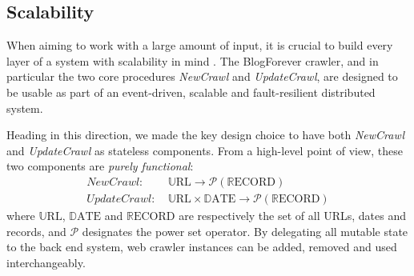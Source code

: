\subsection{Scalability}
When aiming to work with a large amount of input, it is crucial to build every layer of a system with scalability in mind \cite{thereactivemanifesto2013}. The BlogForever crawler, and in particular the two core procedures \emph{NewCrawl} and \emph{UpdateCrawl}, are designed to be usable as part of an event-driven, scalable and fault-resilient distributed system.

Heading in this direction, we made the key design choice to have both \emph{NewCrawl} and \emph{UpdateCrawl} as stateless components. From a high-level point of view, these two components are \emph{purely functional}:
%
\newcommand\URL{\mathbb{U}\text{RL}}
\newcommand\DATE{\mathbb{D}\text{ATE}}
\newcommand\RECORD{\mathbb{R}\text{ECORD}}
\begin{equation*}
  \begin{split}
    NewCrawl:    &~ \URL \rightarrow \mathcal{P}(\RECORD)\\
    UpdateCrawl: &~ \URL \times \DATE \rightarrow \mathcal{P}(\RECORD)
  \end{split}
\end{equation*}
%
where $\URL$, $\DATE$ and $\RECORD$ are respectively the set of all URLs, dates and records, and $\mathcal{P}$ designates the power set operator. By delegating all mutable state to the back end system, web crawler instances can be added, removed and used interchangeably.
